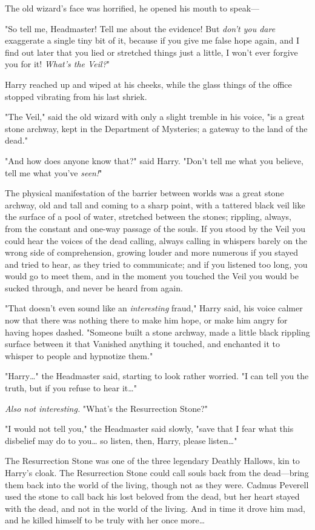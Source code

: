 The old wizard's face was horrified, he opened his mouth to speak---

"So tell me, Headmaster! Tell me about the evidence! But \emph{don't you dare} 
exaggerate a single tiny bit of it, because if you give me false hope again, 
and I find out later that you lied or stretched things just a little, I won't 
ever forgive you for it! \emph{What's the Veil?}"

Harry reached up and wiped at his cheeks, while the glass things of the office 
stopped vibrating from his last shriek.

"The Veil," said the old wizard with only a slight tremble in his voice, "is a 
great stone archway, kept in the Department of Mysteries; a gateway to the land 
of the dead."

"And how does anyone know that?" said Harry. "Don't tell me what you believe, 
tell me what you've \emph{seen!}"

The physical manifestation of the barrier between worlds was a great stone 
archway, old and tall and coming to a sharp point, with a tattered black veil 
like the surface of a pool of water, stretched between the stones; rippling, 
always, from the constant and one-way passage of the souls. If you stood by the 
Veil you could hear the voices of the dead calling, always calling in whispers 
barely on the wrong side of comprehension, growing louder and more numerous if 
you stayed and tried to hear, as they tried to communicate; and if you listened 
too long, you would go to meet them, and in the moment you touched the Veil you 
would be sucked through, and never be heard from again.

"That doesn't even sound like an \emph{interesting} fraud," Harry said, his 
voice calmer now that there was nothing there to make him hope, or make him 
angry for having hopes dashed. "Someone built a stone archway, made a little 
black rippling surface between it that Vanished anything it touched, and 
enchanted it to whisper to people and hypnotize them."

"Harry{\ldots}" the Headmaster said, starting to look rather worried. "I can 
tell you the truth, but if you refuse to hear it{\ldots}"

\emph{Also not interesting.}  "What's the Resurrection Stone?"

"I would not tell you," the Headmaster said slowly, "save that I fear what this 
disbelief may do to you{\ldots} so listen, then, Harry, please listen{\ldots}"

The Resurrection Stone was one of the three legendary Deathly Hallows, kin to 
Harry's cloak. The Resurrection Stone could call souls back from the 
dead---bring them back into the world of the living, though not as they were. 
Cadmus Peverell used the stone to call back his lost beloved from the dead, but 
her heart stayed with the dead, and not in the world of the living. And in time 
it drove him mad, and he killed himself to be truly with her once more{\ldots}


